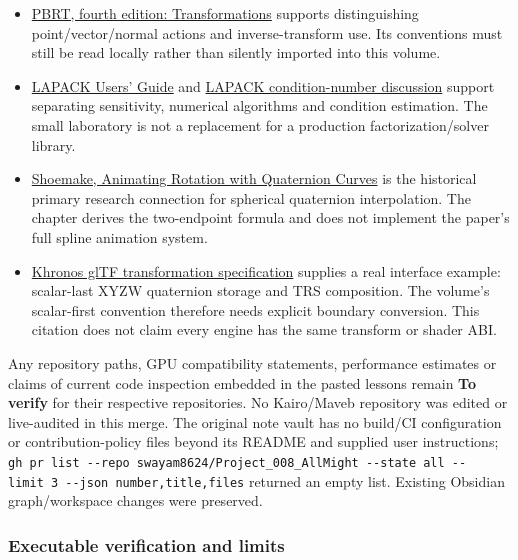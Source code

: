 \begin{itemize}
\tightlist
\item
  \href{https://pbr-book.org/4ed/Geometry_and_Transformations/Transformations}{PBRT, fourth edition: Transformations} supports distinguishing point/vector/normal actions and inverse-transform use. Its conventions must still be read locally rather than silently imported into this volume.
\item
  \href{https://www.netlib.org/lapack/lug/}{LAPACK Users' Guide} and \href{https://www.netlib.org/lapack/lawnspdf/lawn13.pdf}{LAPACK condition-number discussion} support separating sensitivity, numerical algorithms and condition estimation. The small laboratory is not a replacement for a production factorization/solver library.
\item
  \href{https://doi.org/10.1145/325334.325242}{Shoemake, Animating Rotation with Quaternion Curves} is the historical primary research connection for spherical quaternion interpolation. The chapter derives the two-endpoint formula and does not implement the paper's full spline animation system.
\item
  \href{https://github.com/KhronosGroup/glTF/blob/main/specification/2.0/Specification.adoc}{Khronos glTF transformation specification} supplies a real interface example: scalar-last XYZW quaternion storage and TRS composition. The volume's scalar-first convention therefore needs explicit boundary conversion. This citation does not claim every engine has the same transform or shader ABI.
\end{itemize}

Any repository paths, GPU compatibility statements, performance estimates or claims of current code inspection embedded in the pasted lessons remain \textbf{To verify} for their respective repositories. No Kairo/Maveb repository was edited or live-audited in this merge. The original note vault has no build/CI configuration or contribution-policy files beyond its README and supplied user instructions; \texttt{gh\ pr\ list\ -\/-repo\ swayam8624/Project\_008\_AllMight\ -\/-state\ all\ -\/-limit\ 3\ -\/-json\ number,title,files} returned an empty list. Existing Obsidian graph/workspace changes were preserved.

\subsubsection{Executable verification and limits}\label{appendix-a103e7846d21-executable-verification-and-limits}

